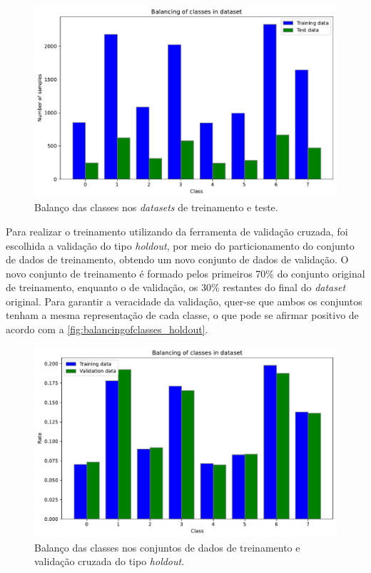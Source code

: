 \begin{figure}[H]
	\centering
	\includegraphics[width=0.75\linewidth]{../../plot/Balancing_of_classes}
	\caption{Balanço das classes nos \textit{datasets} de treinamento e teste.}
	\label{fig:balancingofclasses}
\end{figure}

Para realizar o treinamento utilizando da ferramenta de validação cruzada, foi escolhida a validação do tipo \textit{holdout}, por meio do particionamento do conjunto de dados de treinamento, obtendo um novo conjunto de dados de validação. O novo conjunto de treinamento é formado pelos primeiros 70\% do conjunto original de treinamento, enquanto o de validação, os 30\% restantes do final do \textit{dataset} original. Para garantir a veracidade da validação, quer-se que ambos os conjuntos tenham a mesma representação de cada classe, o que pode se afirmar positivo de acordo com a \autoref{fig:balancingofclasses_holdout}.

\begin{figure}[H]
\centering
\includegraphics[width=0.75\linewidth]{../../plot/Balancing_of_classes_holdout}
\caption{Balanço das classes nos conjuntos de dados de treinamento e validação cruzada do tipo \textit{holdout}.}
\label{fig:balancingofclasses_holdout}
\end{figure}




